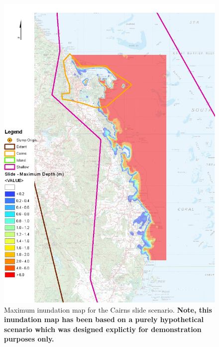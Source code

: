 \documentclass{manual}
\begin{document}
\begin{figure}[htp]
  \centerline{\includegraphics[scale=0.5]{graphics/slidedepth.jpg}}
  \caption{Maximum inundation map for the Cairns slide scenario. \bf Note, this
           inundation map has been based on a purely hypothetical scenario which was
           designed explictiy for demonstration purposes only.}
  \label{fig:maxdepthcairnsslide}
\end{figure}

\clearpage
\end{document}
